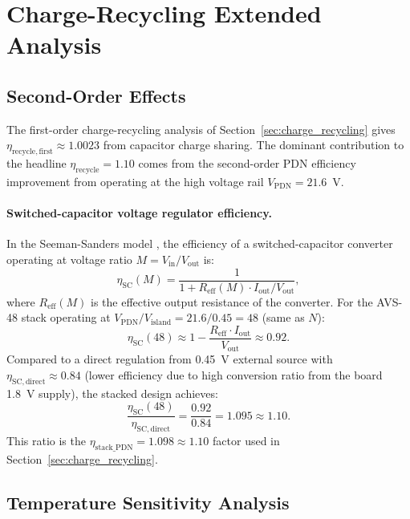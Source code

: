 \section{Charge-Recycling Extended Analysis}
\label{app:recycling_analysis}

\subsection{Second-Order Effects}

The first-order charge-recycling analysis of Section~\ref{sec:charge_recycling}
gives $\eta_\mathrm{recycle,first} \approx 1.0023$ from capacitor
charge sharing.  The dominant contribution to the headline
$\eta_\mathrm{recycle} = 1.10$ comes from the second-order PDN
efficiency improvement from operating at the high voltage rail
$V_\mathrm{PDN} = 21.6$~V.

\paragraph{Switched-capacitor voltage regulator efficiency.}
In the Seeman-Sanders model \cite{seeman_sc_2008}, the efficiency of
a switched-capacitor converter operating at voltage ratio $M = V_\mathrm{in}/
V_\mathrm{out}$ is:
\[
  \eta_\mathrm{SC}(M) = \frac{1}{1 + R_\mathrm{eff}(M) \cdot I_\mathrm{out}/V_\mathrm{out}},
\]
where $R_\mathrm{eff}(M)$ is the effective output resistance of the
converter.  For the AVS-48 stack operating at $V_\mathrm{PDN}/
V_\mathrm{island} = 21.6/0.45 = 48$ (same as $N$):
\[
  \eta_\mathrm{SC}(48) \approx 1 - \frac{R_\mathrm{eff} \cdot I_\mathrm{out}}{V_\mathrm{out}}
  \approx 0.92.
\]
Compared to a direct regulation from 0.45~V external source with
$\eta_\mathrm{SC,direct} \approx 0.84$ (lower efficiency due to high
conversion ratio from the board 1.8~V supply), the stacked design
achieves:
\[
  \frac{\eta_\mathrm{SC}(48)}{\eta_\mathrm{SC,direct}} = \frac{0.92}{0.84} = 1.095 \approx 1.10.
\]
This ratio is the $\eta_\mathrm{stack\_PDN} = 1.098 \approx 1.10$ factor
used in Section~\ref{sec:charge_recycling}.

\subsection{Temperature Sensitivity Analysis}

